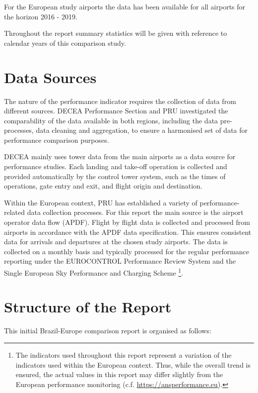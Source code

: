 \documentclass[
]{book}
\begin{document}
For the European study airports the data has been available for all airports for the horizon 2016 - 2019.

Throughout the report summary statistics will be given with reference to calendar years of this comparison study.

\hypertarget{data-sources}{%
\section{Data Sources}\label{data-sources}}

The nature of the performance indicator requires the collection of data from different sources. DECEA Performance Section and PRU investigated the comparability of the data available in both regions, including the data pre-processes, data cleaning and aggregation, to ensure a harmonised set of data for performance comparison purposes.

DECEA mainly uses tower data from the main airports as a data source for performance studies.
Each landing and take-off operation is collected and provided automatically by the control tower system, such as the times of operations, gate entry and exit, and flight origin and destination.

Within the European context, PRU has established a variety of performance-related data collection processes. For this report the main source is the airport operator data flow (APDF).
Flight by flight data is collected and processed from airports in accordance with the APDF data specification.
This ensures consistent data for arrivals and departures at the chosen study airports.
The data is collected on a monthly basis and typically processed for the regular performance reporting under the EUROCONTROL Performance Review System and the Single European Sky Performance and Charging Scheme \footnote{The indicators used throughout this report represent a variation of the indicators used within the European context. Thus, while the overall trend is ensured, the actual values in this report may differ slightly from the European performance monitoring (c.f. \url{https://ansperformance.eu}).}.

\hypertarget{structure-of-the-report}{%
\section{Structure of the Report}\label{structure-of-the-report}}

This initial Brazil-Europe comparison report is organised as follows:
\end{document}
